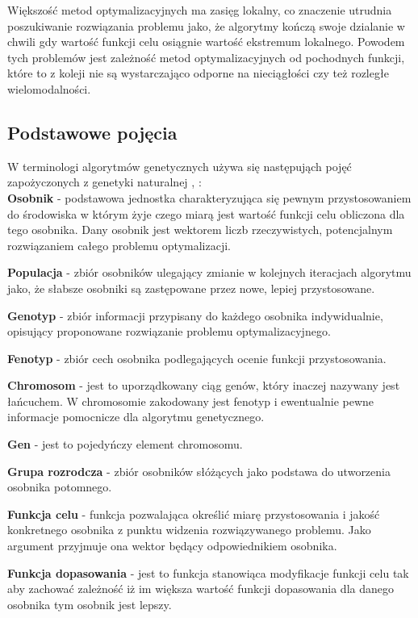 Większość metod optymalizacyjnych ma zasięg lokalny, co znaczenie utrudnia poszukiwanie rozwiązania problemu jako, że algorytmy kończą swoje dzialanie w chwili gdy wartość funkcji celu osiągnie wartość ekstremum lokalnego. Powodem tych problemów jest zależność metod optymalizacyjnych od pochodnych funkcji, które to z koleji nie są wystarczająco odporne na nieciągłości czy też rozległe wielomodalności.
\par

\subsection{Podstawowe pojęcia}
W terminologi algorytmów genetycznych używa się następująch pojęć zapożyczonych z genetyki naturalnej \cite{michal}, \cite{maszynowe_sel}:\\

\textbf{Osobnik} - podstawowa jednostka charakteryzująca się pewnym przystosowaniem do środowiska w którym żyje czego miarą jest wartość funkcji celu obliczona dla tego osobnika. Dany osobnik jest wektorem liczb rzeczywistych, potencjalnym rozwiązaniem całego problemu optymalizacji.

\textbf{Populacja} - zbiór osobników ulegający zmianie w kolejnych iteracjach algorytmu jako, że słabsze osobniki są zastępowane przez nowe, lepiej przystosowane.

\textbf{Genotyp} - zbiór informacji przypisany do każdego osobnika indywidualnie, opisujący proponowane rozwiązanie problemu optymalizacyjnego.

\textbf{Fenotyp} - zbiór cech osobnika podlegających ocenie funkcji przystosowania.

\textbf{Chromosom} - jest to uporządkowany ciąg genów, który inaczej nazywany jest łańcuchem. W chromosomie zakodowany jest fenotyp i ewentualnie pewne informacje pomocnicze dla algorytmu genetycznego.

\textbf{Gen} - jest to pojedyńczy element chromosomu.

\textbf{Grupa rozrodcza} - zbiór osobników słóżących jako podstawa do utworzenia osobnika potomnego.

\textbf{Funkcja celu} - funkcja pozwalająca określić miarę przystosowania i jakość konkretnego osobnika z punktu widzenia rozwiązywanego problemu. Jako argument przyjmuje ona wektor będący odpowiednikiem osobnika.

\textbf{Funkcja dopasowania} - jest to funkcja stanowiąca modyfikacje funkcji celu tak aby zachować zależność iż im większa wartość funkcji dopasowania dla danego osobnika tym osobnik jest lepszy.

